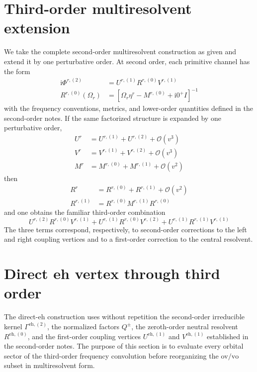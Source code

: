 \documentclass[aip,jcp,reprint,noshowkeys,superscriptaddress]{revtex4-1}
\newcommand{\ii}{\mathrm{i}}
\newcommand{\eh}{\text{eh}}
\begin{document}
\section{Third-order multiresolvent extension}
\label{sec:multiresolvent_third}

We take the complete second-order multiresolvent construction as given and
extend it by one perturbative order.
At second order, each primitive channel has the form
\begin{align}
    \ii\Phi^{r,(2)}
    &=
    U^{r,(1)}R^{r,(0)}V^{r,(1)}
    \\
    R^{r,(0)}(\Omega_r)
    &=
    [\Omega_r\eta^r-M^{r,(0)} + \ii 0^+ I]^{-1}
    \label{eq:third_starting_point}
\end{align}
with the frequency conventions, metrics, and lower-order quantities defined
in the second-order notes.
If the same factorized structure is expanded by one perturbative order,
\begin{align}
    U^r
    &=
    U^{r,(1)}+U^{r,(2)}+\mathcal O(v^3)
    \\
    V^r
    &=
    V^{r,(1)}+V^{r,(2)}+\mathcal O(v^3)
    \label{eq:target_UV_expansion}
    \\
    M^r
    &=
    M^{r,(0)}+M^{r,(1)}+\mathcal O(v^2)
    \label{eq:target_M_expansion}
\end{align}
then
\begin{align}
    R^r
    &=
    R^{r,(0)}+R^{r,(1)}+\mathcal O(v^2)
    \\
    R^{r,(1)}
    &=
    R^{r,(0)}M^{r,(1)}R^{r,(0)}
    \label{eq:target_R_first}
\end{align}
and one obtains the familiar third-order combination
\begin{equation}
    U^{r,(2)}R^{r,(0)}V^{r,(1)}
    +
    U^{r,(1)}R^{r,(0)}V^{r,(2)}
    +
    U^{r,(1)}R^{r,(1)}V^{r,(1)}
    \label{eq:target_third_order}
\end{equation}
The three terms correspond, respectively, to second-order corrections to the left and right coupling vertices and to a first-order correction to the central resolvent.

\section{Direct eh vertex through third order}
\label{sec:eh_third}

The direct-$\eh$ construction uses without repetition the second-order
irreducible kernel $\Gamma^{\eh,(2)}$, the normalized factors $Q^\pm$,
the zeroth-order neutral resolvent $R^{\eh,(0)}$, and the first-order
coupling vertices $U^{\eh,(1)}$ and $V^{\eh,(1)}$ established in the
second-order notes.
The purpose of this section is to evaluate every orbital sector of the
third-order frequency convolution before reorganizing the $\text{ov}/\text{vo}$ subset in
multiresolvent form.
\end{document}
